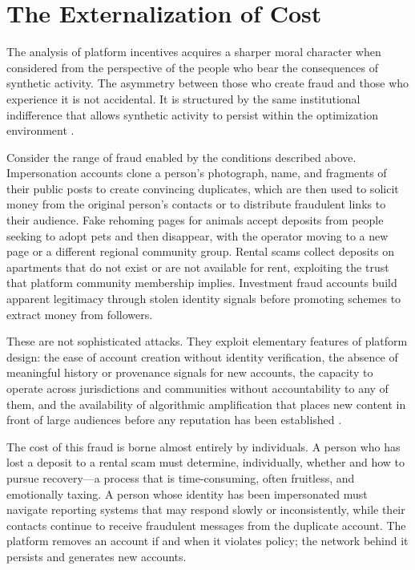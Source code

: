 \documentclass[12pt,a4paper]{article}
\begin{document}
\section{The Externalization of Cost}

The analysis of platform incentives acquires a sharper moral character when considered from
the perspective of the people who bear the consequences of synthetic activity. The asymmetry
between those who create fraud and those who experience it is not accidental. It is structured
by the same institutional indifference that allows synthetic activity to persist within the
optimization environment \citep{noble2018}.

Consider the range of fraud enabled by the conditions described above. Impersonation accounts
clone a person's photograph, name, and fragments of their public posts to create convincing
duplicates, which are then used to solicit money from the original person's contacts or to
distribute fraudulent links to their audience. Fake rehoming pages for animals accept deposits
from people seeking to adopt pets and then disappear, with the operator moving to a new page
or a different regional community group. Rental scams collect deposits on apartments that do
not exist or are not available for rent, exploiting the trust that platform community membership
implies. Investment fraud accounts build apparent legitimacy through stolen identity signals
before promoting schemes to extract money from followers.

These are not sophisticated attacks. They exploit elementary features of platform design: the
ease of account creation without identity verification, the absence of meaningful history or
provenance signals for new accounts, the capacity to operate across jurisdictions and communities
without accountability to any of them, and the availability of algorithmic amplification that
places new content in front of large audiences before any reputation has been established
\citep{gillespie2018,tufekci2015}.

The cost of this fraud is borne almost entirely by individuals. A person who has lost a deposit
to a rental scam must determine, individually, whether and how to pursue recovery---a process
that is time-consuming, often fruitless, and emotionally taxing. A person whose identity has been
impersonated must navigate reporting systems that may respond slowly or inconsistently, while
their contacts continue to receive fraudulent messages from the duplicate account. The platform
removes an account if and when it violates policy; the network behind it persists and generates
new accounts.
\end{document}
